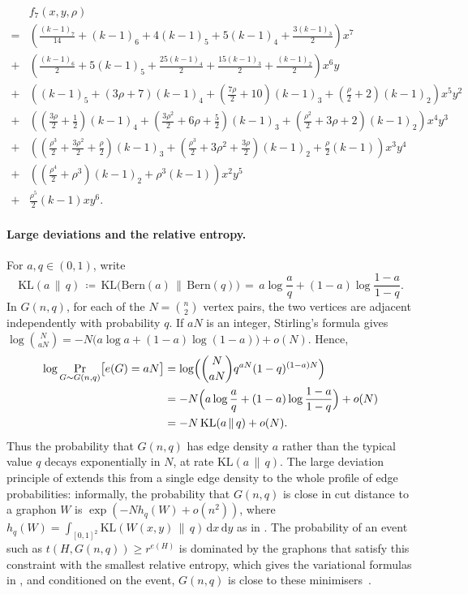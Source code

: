 \documentclass[11pt]{article}
\theoremstyle{plain}
\theoremstyle{definition}
\theoremstyle{remark}
\begin{document}
\begin{align*}
  &f_7(x, y, \rho)
  \\
  {} = &\left(\frac{(k-1)_7}{14} + (k-1)_6 + 4 (k-1)_5 + 5(k-1)_4 + \frac{3(k-1)_3}{2}\right) x^7
  \\
  {} + &\left( \frac{(k-1)_6}{2} + 5 (k-1)_5 + \frac{25(k-1)_4}{2} + \frac{15 (k-1)_3}{2} + \frac{(k-1)_2}{2} \right) x^6 y
  \\
  {} + &\left( (k-1)_5 + (3\rho + 7)(k-1)_4 + \left( \frac{7\rho}{2} + 10 \right) (k-1)_3 + \left( \frac{\rho}{2} + 2 \right) (k-1)_2 \right) x^5 y^2
  \\
  {} + &\left( \left( \frac{3 \rho}{2} + \frac{1}{2} \right) (k-1)_4 + \left( \frac{3\rho^2}{2} + 6 \rho + \frac{5}{2} \right)(k-1)_3 + \left( \frac{\rho^2}{2} + 3\rho + 2 \right)(k-1)_2\right) x^4 y^3
  \\
  {} + &\left( \left( \frac{\rho^3}{2} + \frac{3\rho^2}{2} + \frac{\rho}{2} \right)(k-1)_3 + \left( \frac{\rho^3}{2} + 3\rho^2 + \frac{3\rho}{2} \right)(k-1)_2 + \frac{\rho}{2} (k-1) \right) x^3 y^4
  \\
  {} + &\left( \left( \frac{\rho^4}{2} + \rho^3 \right) (k-1)_2 + \rho^3 (k-1) \right) x^2 y^5
  \\
  {} + & \frac{\rho^5}{2} (k-1) x y^6.
\end{align*}

\paragraph{Large deviations and the relative entropy.}
For $a, q \in (0,1)$, write
\[
\mathrm{KL}(a \,\|\, q) \,\coloneqq\, \mathrm{KL}\bigl(\mathrm{Bern}(a) \,\|\, \mathrm{Bern}(q)\bigr) \,=\, a \log\frac{a}{q} + (1-a) \log\frac{1-a}{1-q}.
\]
In $G(n, q)$, for each of the $N = \binom{n}{2}$ vertex pairs, the two vertices are adjacent independently with probability $q$. If $aN$ is an integer, Stirling's formula gives $\log\binom{N}{aN} = -N\bigl(a \log a + (1-a)\log(1-a)\bigr) + o(N)$. Hence,
\begin{align*}
\log \Pr_{G \sim G(n, q)}\bigl[e(G) = aN\bigr]
&= \log\Bigl(\binom{N}{aN} q^{aN} (1-q)^{(1-a)N}\Bigr)
\\
&= -N\Bigl(a \log\frac{a}{q} + (1-a) \log\frac{1-a}{1-q}\Bigr) + o(N)
\\
&= -N\, \mathrm{KL}(a \,\|\, q) + o(N).
\end{align*}
Thus the probability that $G(n, q)$ has edge density $a$ rather than the typical value $q$ decays exponentially in $N$, at rate $\mathrm{KL}(a \,\|\, q)$. The large deviation principle of \citet{chatterjee2011large} extends this from a single edge density to the whole profile of edge probabilities: informally, the probability that $G(n, q)$ is close in cut distance to a graphon $W$ is $\exp(-N h_q(W) + o(n^2))$, where $h_q(W) = \int_{[0,1]^2} \mathrm{KL}(W(x,y) \,\|\, q)\, \mathrm{d}x\, \mathrm{d}y$ as in . The probability of an event such as $t(H, G(n,q)) \ge r^{e(H)}$ is dominated by the graphons that satisfy this constraint with the smallest relative entropy, which gives the variational formulas in , and conditioned on the event, $G(n, q)$ is close to these minimisers~\citep{lubetzky2015replica}.
\end{document}
